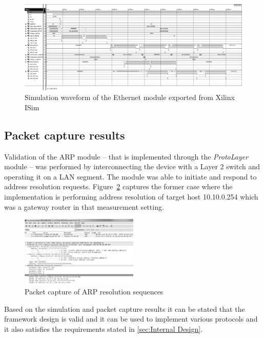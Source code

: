 \documentclass[conference]{IEEEtran}
\begin{document}
\begin{figure}[!htb]
    \centering
    \includegraphics[width=1\textwidth]{figures_raw/ether_tst_wave.png}
    \caption{Simulation waveform of the Ethernet module exported from Xilinx ISim}
    \label{fig:eth_sim}
\end{figure}

\subsection{Packet capture results}

Validation of the ARP module -- that is implemented through the \emph{ProtoLayer} module -- was performed by interconnecting the device with a Layer 2 switch and operating it on a LAN segment. The module was able to initiate and respond to address resolution requests. Figure~\ref{fig:pcap_arp_seq} captures the former case where the implementation is performing address resolution of target host 10.10.0.254 which was a gateway router in that measurement setting.

\begin{figure}[!htb]
    \centering
    \includegraphics[width=0.5\textwidth]{figures_raw/arp_transaction.png}
    \caption{Packet capture of ARP resolution sequences}
    \label{fig:pcap_arp_seq}
\end{figure}

Based on the simulation and packet capture results it can be stated that the framework design is valid and it can be used to implement various protocols and it also satisfies the requirements stated in \ref{sec:Internal Design}.
\end{document}
